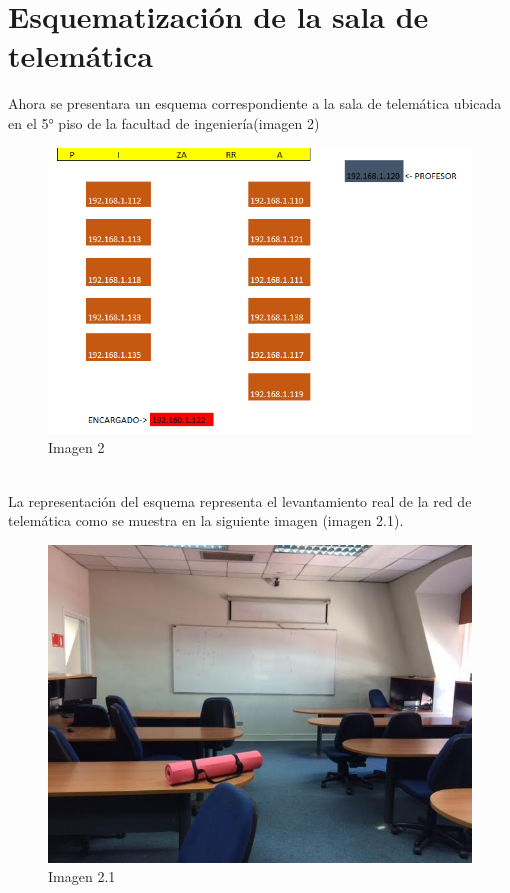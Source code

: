 \documentclass[spanish]{udpreport}
\begin{document}
\section{Esquematización de la sala de telemática}
Ahora se presentara un esquema correspondiente a la sala de telemática ubicada en el 5° piso de la facultad de ingeniería(imagen 2)
\\[0.2cm]
\begin{figure}[h]
    \centering
    \includegraphics[scale=0.5]{images/telematica.png}
    \caption{Imagen 2}
    \label{fig:my_label}
\end{figure}
\\[0.2cm]
La representación del esquema representa el levantamiento real de la red de telemática como se muestra en la siguiente imagen (imagen 2.1).
\\[0.2cm]
\begin{figure}[h]
    \centering
    \includegraphics[scale=0.3]{images/unnamed.jpg}
    \caption{Imagen 2.1}
    \label{fig:my_label}
\end{figure}
\newpage
\end{document}
